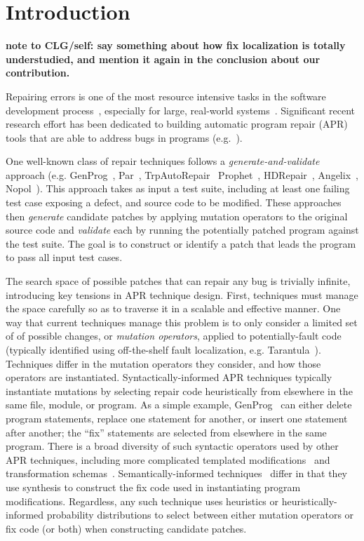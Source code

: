 \documentclass[conference]{IEEEtran}
\newcommand{\todo}[1]
  {{\scriptsize \textbf{\color{red} {#1}}}}
\begin{document}
\section{Introduction} \label{introduction}

\todo{note to CLG/self: say something about how fix localization is totally
  understudied, and mention it again in the conclusion about our contribution.}

Repairing errors is one of the most 
resource intensive tasks in 
the software development process~\cite{Weiss07,Tassey02,Britton13}, especially for large, real-world systems~\cite{Liblit03,Anvik05}.
%
Significant recent research effort has been dedicated to
building automatic program repair (APR) tools that are able to address
bugs in 
programs (e.g.~\cite{legoues12,kim2013,Weimer13,long15SPR,long16proph,debroy10,perkins09,wei10}).

One well-known class of repair techniques follows a 
\emph{generate-and-validate} approach  (e.g. GenProg~\cite{legoues12}, 
Par~\cite{kim2013}, TrpAutoRepair~\cite{Qi13TrpAutoR}
Prophet~\cite{long16proph}, HDRepair~\cite{xuan16}, Angelix~\cite{Mechtaev2016},
Nopol~\cite{xuanNopol}).  This approach takes as input a test suite, 
including at
least one failing test case exposing
a defect, and source code to be 
modified.  These approaches then \emph{generate} candidate patches
by applying 
mutation operators to the original source code and \emph{validate} each by
running the potentially patched program against the test suite.  The goal is to
construct or identify a patch that
leads the program to pass all input test cases. 

The search space of possible patches that can repair any bug is trivially
infinite, introducing key tensions in APR
technique design.  First, 
techniques must manage the space carefully so as to traverse it in a scalable and
effective manner.  One way that current techniques manage this problem is to
only consider a limited set of of possible changes, or \emph{mutation operators}, 
applied to potentially-fault code (typically identified using off-the-shelf fault 
localization, e.g. Tarantula~\cite{Jones02}).  
Techniques differ in the mutation operators they consider, and how those operators
are instantiated.  Syntactically-informed APR techniques typically instantiate
mutations by selecting repair code heuristically from elsewhere in the same
file, module, or program.  As a simple example, GenProg~\cite{legoues12Genprog} can either
delete program statements, replace one statement for another, or insert one
statement after another; the ``fix'' statements are selected from elsewhere in
the same program.  There is a broad diversity of such syntactic operators used
by other APR techniques, including more complicated templated modifications~\cite{kim2013} and transformation 
schemas~\cite{long16proph,long15SPR}.  Semantically-informed
techniques~\cite{nguyen13,Mechtaev2016,xuanNopol} differ in that they use synthesis to
construct the fix code used in instantiating program modifications.  
Regardless, any such technique uses heuristics or heuristically-informed
probability distributions to select between either mutation operators or fix
code (or both) when constructing candidate patches. 
\end{document}
